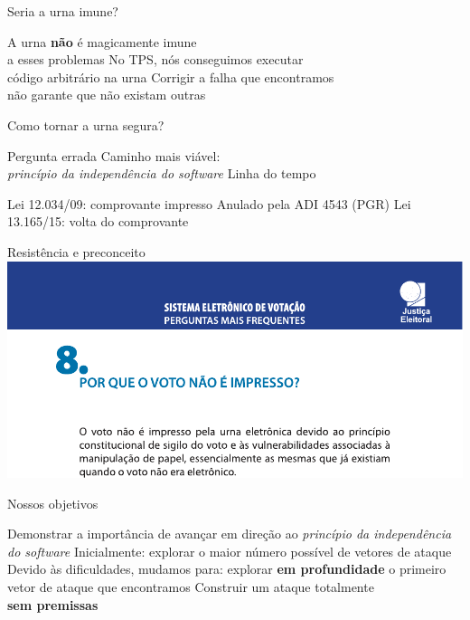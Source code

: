 \documentclass[14pt]{beamer}
\begin{document}
\begin{frame}{Seria a urna imune?}
  \begin{fullpageitemize}
    \itemR A urna \textbf{não} é magicamente imune\\a esses problemas
    \itemR No TPS, nós conseguimos executar\\código arbitrário na urna
    \itemR Corrigir a falha que encontramos\\não garante que não existam outras
  \end{fullpageitemize}
\end{frame}

\begin{frame}{Como tornar a urna segura?}
  \begin{fullpageitemize}
    \itemR Pergunta errada
    \itemR Caminho mais viável:\\ \textit{princípio da independência do software}
    \itemR Linha do tempo
    \begin{itemize}
      \itemR Lei 12.034/09: comprovante impresso
      \itemR Anulado pela ADI 4543 (PGR)
      \itemR Lei 13.165/15: volta do comprovante
    \end{itemize}
  \end{fullpageitemize}
\end{frame}

\begin{frame}{Resistência e preconceito}
  \centering
  \includegraphics[width=\textwidth,height=0.90\textheight,keepaspectratio]{images/tsefaq_votoimpresso}
\end{frame}

\begin{frame}{Nossos objetivos}
  \begin{fullpageitemize}
    \itemR Demonstrar a importância de avançar em direção ao \textit{princípio da independência do software}
    \itemR Inicialmente: explorar o maior número possível de vetores de ataque
    \itemR Devido às dificuldades, mudamos para: explorar \textbf{em profundidade} o primeiro vetor de ataque que encontramos
    \itemR Construir um ataque totalmente\\\textbf{sem premissas}
  \end{fullpageitemize}
\end{frame}
\end{document}

